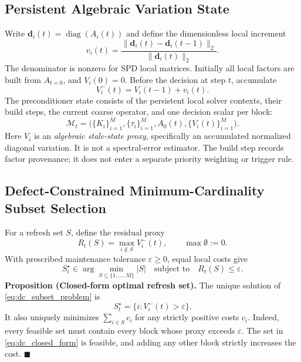\subsection{Persistent Algebraic Variation State}
\label{subsec:diag_proxy}
Write $\mathbf d_i(t)=\operatorname{diag}(A_i(t))$ and define the
dimensionless local increment
\begin{equation}
v_i(t)=\frac{\|\mathbf d_i(t)-\mathbf d_i(t-1)\|_2}
                  {\|\mathbf d_i(t)\|_2}.
\label{eq:dc_increment}
\end{equation}
The denominator is nonzero for SPD local matrices. Initially all local factors
are built from $A_{t=0}$, and $V_i(0)=0$. Before the decision at step $t$, accumulate
\begin{equation}
V_i^-(t)=V_i(t-1)+v_i(t).
\label{eq:dc_state_evolution}
\end{equation}
The preconditioner state consists of the persistent local solver contexts,
their build steps, the current coarse operator, and one decision scalar per block:
\begin{equation}
\mathcal M_t=\bigl(\{K_i\}_{i=1}^M,\{\tau_i\}_{i=1}^M,
                        A_0(t),\{V_i(t)\}_{i=1}^M\bigr).
\label{eq:state_tuple}
\end{equation}
Here $V_i$ is an \emph{algebraic stale-state proxy}, specifically an accumulated
normalized diagonal variation. It is not a spectral-error estimator.
The build step records factor provenance; it does not enter a separate
priority weighting or trigger rule.

\subsection{Defect-Constrained Minimum-Cardinality Subset Selection}
For a refresh set $S$, define the residual proxy
\begin{equation}
R_t(S)=\max_{i\notin S}V_i^-(t),\qquad \max\emptyset:=0.
\label{eq:dc_residual_proxy}
\end{equation}
With prescribed maintenance tolerance $\varepsilon\ge0$, equal local costs give
\begin{equation}
S_t^\star\in\arg\min_{S\subseteq\{1,\ldots,M\}}|S|
\quad\text{subject to}\quad R_t(S)\le\varepsilon.
\label{eq:dc_subset_problem}
\end{equation}
\noindent\textbf{Proposition (Closed-form optimal refresh set).}
The unique solution of \eqref{eq:dc_subset_problem} is
\begin{equation}
\boxed{S_t^\star=\{i:V_i^-(t)>\varepsilon\}.}
\label{eq:dc_closed_form}
\end{equation}
It also uniquely minimizes $\sum_{i\in S}c_i$ for any strictly positive costs
$c_i$. Indeed, every feasible set must contain every block whose proxy exceeds
$\varepsilon$. The set in \eqref{eq:dc_closed_form} is feasible, and adding any
other block strictly increases the cost. \hfill $\blacksquare$


